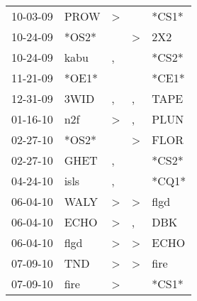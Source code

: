\begin{supertabular}{p{0.07\textwidth}p{0.06\textwidth}p{0.02\textwidth}p{0.02\textwidth}p{0.06\textwidth}}
          10-03-09\textsuperscript{} &           PROW\textsuperscript{} &     \textgreater &                  &                            *CS1* \\
          10-24-09\textsuperscript{} &                            *OS2* &                  &     \textgreater &            2X2\textsuperscript{} \\
          10-24-09\textsuperscript{} &           kabu\textsuperscript{} &                , &                  &                            *CS2* \\
          11-21-09\textsuperscript{} &                            *OE1* &                  &                  &                            *CE1* \\
          12-31-09\textsuperscript{} &           3WID\textsuperscript{} &                , &                , &           TAPE\textsuperscript{} \\
          01-16-10\textsuperscript{} &            n2f\textsuperscript{} &     \textgreater &                , &           PLUN\textsuperscript{} \\
          02-27-10\textsuperscript{} &                            *OS2* &                  &     \textgreater &           FLOR\textsuperscript{} \\
          02-27-10\textsuperscript{} &           GHET\textsuperscript{} &                , &                  &                            *CS2* \\
          04-24-10\textsuperscript{} &           isls\textsuperscript{} &                , &                  &                            *CQ1* \\
          06-04-10\textsuperscript{} &           WALY\textsuperscript{} &     \textgreater &     \textgreater &           flgd\textsuperscript{} \\
          06-04-10\textsuperscript{} &           ECHO\textsuperscript{} &     \textgreater &                , &            DBK\textsuperscript{} \\
          06-04-10\textsuperscript{} &           flgd\textsuperscript{} &     \textgreater &     \textgreater &           ECHO\textsuperscript{} \\
          07-09-10\textsuperscript{} &            TND\textsuperscript{} &     \textgreater &     \textgreater &           fire\textsuperscript{} \\
          07-09-10\textsuperscript{} &           fire\textsuperscript{} &     \textgreater &                  &                            *CS1* \\

\end{supertabular}
